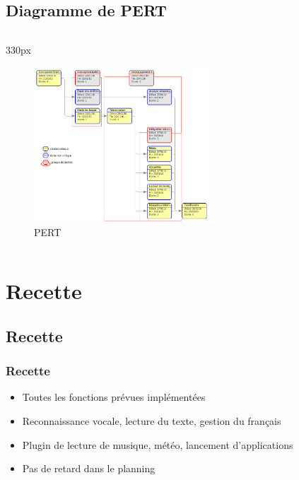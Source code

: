 \documentclass{beamer}
\begin{document}
\subsection{Diagramme de PERT}
{
\logo{}
\begin{frame}
\begin{center}
\begin{columns}
\begin{column}{330px}
{
    \vspace{-0.5em}
    \begin{figure}[h!]
        \centering
        \includegraphics[height=220px]
            {images/pert}
        \vspace{-1em}
        \caption{PERT}
    \end{figure}
}
\end{column}
\end{columns}
\end{center}
\end{frame}
}


\section{Recette}

\subsection{Recette}
\begin{frame}
\frametitle{Recette}
\begin{itemize}
    \setlength\itemsep{2em}
    \item Toutes les fonctions prévues implémentées
    \item Reconnaissance vocale, lecture du texte, gestion du français
    \item Plugin de lecture de musique, météo, lancement d'applications
    \item Pas de retard dans le planning
\end{itemize}
\end{frame}
\end{document}
